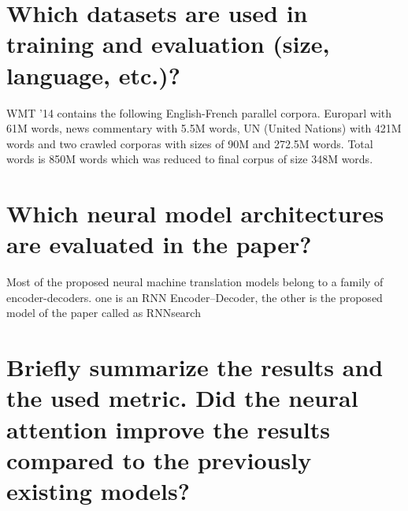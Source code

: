 \documentclass{article}
\begin{document}
\pagestyle{fancy}
\fancyhead{} %


\section{Which datasets are used in training and evaluation (size, language, etc.)?}
WMT ’14 contains the following English-French parallel corpora. Europarl with 61M words, news commentary with 5.5M words, UN (United Nations) with 421M words and two crawled corporas with sizes of 90M and 272.5M words. Total words is 850M words which was reduced to final corpus of size 348M words.



\section{Which neural model architectures are evaluated in the paper?}
Most of the proposed neural machine translation models belong to a family of encoder-decoders.
one is an RNN Encoder–Decoder, the other is the proposed model of the paper called as RNNsearch

\section{Briefly summarize the results and the used metric. Did the neural attention improve the results compared to the previously existing models?}
\end{document}
